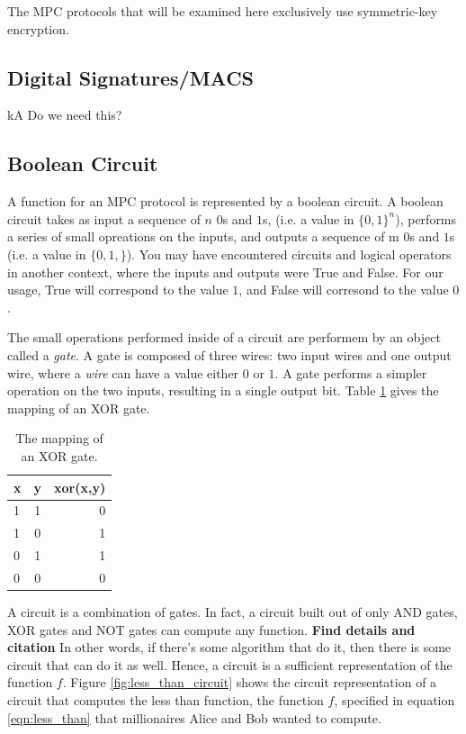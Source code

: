 \documentclass[12pt,twoside]{reedthesis}
\begin{document}
The MPC protocols that will be examined here exclusively use symmetric-key encryption.

\subsection{Digital Signatures/MACS}
kA
Do we need this?

\subsection{Boolean Circuit} 
A function for an MPC protocol is represented by a boolean circuit.
A boolean circuit takes as input a sequence of $n$ $0$s and $1$s, (i.e. a value in $\{0,1\}^n$), performs a series of small opreations on the inputs, and outputs a sequence of m $0$s and $1$s (i.e. a value in $\{0,1,\}$).
You may have encountered circuits and logical operators in another context, where the inputs and outputs were True and False.
For our usage, True will correspond to the value $1$, and False will corresond to the value $0$. 

The small operations performed inside of a circuit are performem by an object called a \emph{gate}.
A gate is composed of three wires: two input wires and one output wire, where a \emph{wire} can have a value either $0$ or $1$.
A gate performs a simpler operation on the two inputs, resulting in a single output bit.
Table \ref{tab:xor} gives the mapping of an XOR gate.

\begin{table}[h]
\label{tab:xor}
\centering
\begin{tabular}{ | l | c || r |}
\hline
x & y & xor(x,y) \\ \hline
1 & 1 & 0 \\ \hline
1 & 0 & 1 \\ \hline
0 & 1 & 1 \\ \hline
0 & 0 & 0 \\ \hline
\end{tabular}
\caption{The mapping of an XOR gate.}
\end{table}

A circuit is a combination of gates. 
In fact, a circuit built out of only AND gates, XOR gates and NOT gates can compute any function.
\textbf{Find details and citation} In other words, if there's some algorithm that do it, then there is some circuit that can do it as well.
Hence, a circuit is a sufficient representation of the function $f$.
Figure \ref{fig:less_than_circuit} shows the circuit representation of a circuit that computes the less than function, the function $f$, specified in equation \ref{eqn:less_than} that millionaires Alice and Bob wanted to compute.
\end{document}
